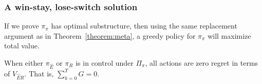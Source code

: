 \subsubsection*{A win-stay, lose-switch solution}
If we prove $\pi_{\pi}$ has optimal substructure, then using the same replacement argument \citep{Roughgarden2019} as in Theorem~\ref{theorem:meta}, a greedy policy for $\pi_\pi$ will maximize total value.

\begin{theorem}
	\label{th:no_regret_ER}
	When either $\pi_{\hat E}$ or $\pi_R$ is in control under $\Pi_{\pi}$, all actions are zero regret in terms of $V_{\hat{E}R}$. That is, $\sum_{k=0}^{T} G = 0$.
\end{theorem}


    
    
	
	

